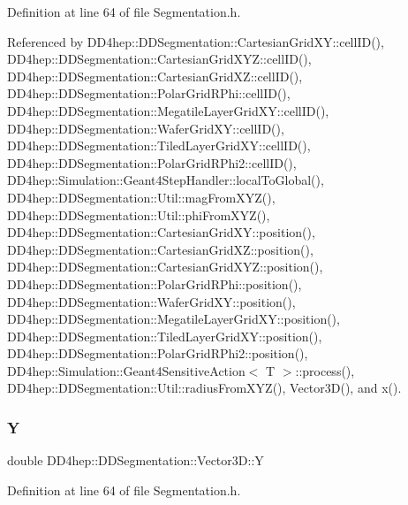 Definition at line 64 of file Segmentation.\+h.



Referenced by D\+D4hep\+::\+D\+D\+Segmentation\+::\+Cartesian\+Grid\+X\+Y\+::cell\+I\+D(), D\+D4hep\+::\+D\+D\+Segmentation\+::\+Cartesian\+Grid\+X\+Y\+Z\+::cell\+I\+D(), D\+D4hep\+::\+D\+D\+Segmentation\+::\+Cartesian\+Grid\+X\+Z\+::cell\+I\+D(), D\+D4hep\+::\+D\+D\+Segmentation\+::\+Polar\+Grid\+R\+Phi\+::cell\+I\+D(), D\+D4hep\+::\+D\+D\+Segmentation\+::\+Megatile\+Layer\+Grid\+X\+Y\+::cell\+I\+D(), D\+D4hep\+::\+D\+D\+Segmentation\+::\+Wafer\+Grid\+X\+Y\+::cell\+I\+D(), D\+D4hep\+::\+D\+D\+Segmentation\+::\+Tiled\+Layer\+Grid\+X\+Y\+::cell\+I\+D(), D\+D4hep\+::\+D\+D\+Segmentation\+::\+Polar\+Grid\+R\+Phi2\+::cell\+I\+D(), D\+D4hep\+::\+Simulation\+::\+Geant4\+Step\+Handler\+::local\+To\+Global(), D\+D4hep\+::\+D\+D\+Segmentation\+::\+Util\+::mag\+From\+X\+Y\+Z(), D\+D4hep\+::\+D\+D\+Segmentation\+::\+Util\+::phi\+From\+X\+Y\+Z(), D\+D4hep\+::\+D\+D\+Segmentation\+::\+Cartesian\+Grid\+X\+Y\+::position(), D\+D4hep\+::\+D\+D\+Segmentation\+::\+Cartesian\+Grid\+X\+Z\+::position(), D\+D4hep\+::\+D\+D\+Segmentation\+::\+Cartesian\+Grid\+X\+Y\+Z\+::position(), D\+D4hep\+::\+D\+D\+Segmentation\+::\+Polar\+Grid\+R\+Phi\+::position(), D\+D4hep\+::\+D\+D\+Segmentation\+::\+Wafer\+Grid\+X\+Y\+::position(), D\+D4hep\+::\+D\+D\+Segmentation\+::\+Megatile\+Layer\+Grid\+X\+Y\+::position(), D\+D4hep\+::\+D\+D\+Segmentation\+::\+Tiled\+Layer\+Grid\+X\+Y\+::position(), D\+D4hep\+::\+D\+D\+Segmentation\+::\+Polar\+Grid\+R\+Phi2\+::position(), D\+D4hep\+::\+Simulation\+::\+Geant4\+Sensitive\+Action$<$ T $>$\+::process(), D\+D4hep\+::\+D\+D\+Segmentation\+::\+Util\+::radius\+From\+X\+Y\+Z(), Vector3\+D(), and x().

\hypertarget{struct_d_d4hep_1_1_d_d_segmentation_1_1_vector3_d_a9cde1750ebf8b923704e6118f00d1ed6}{}\label{struct_d_d4hep_1_1_d_d_segmentation_1_1_vector3_d_a9cde1750ebf8b923704e6118f00d1ed6} 
\subsubsection{\texorpdfstring{Y}{Y}}
{\footnotesize\ttfamily double D\+D4hep\+::\+D\+D\+Segmentation\+::\+Vector3\+D\+::Y}



Definition at line 64 of file Segmentation.\+h.



